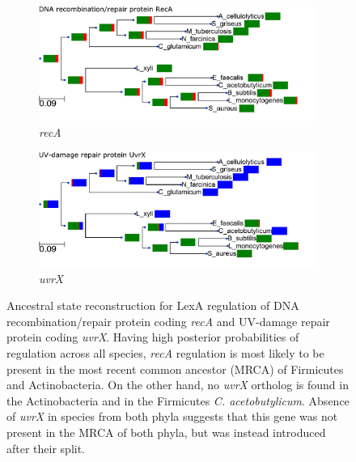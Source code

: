 \begin{figure}
  \centering
  \begin{subfigure}{0.49\textwidth}
    \includegraphics[width=\textwidth]{figures/chapter4/recA_ASR}
    \caption{\textit{recA}}
    \label{fig:ASR-a}
  \end{subfigure}
  \begin{subfigure}{0.49\textwidth}
    \includegraphics[width=\textwidth]{figures/chapter4/uvrX_ASR}
    \caption{\textit{uvrX}}
    \label{fig:ASR-b}
  \end{subfigure}
  \caption{Ancestral state reconstruction for LexA regulation of DNA
    recombination/repair protein coding \textit{recA} and UV-damage repair
    protein coding \textit{uvrX}. Having high posterior probabilities of
    regulation across all species, \textit{recA} regulation is most likely to
    be present in the most recent common ancestor (MRCA) of Firmicutes and
    Actinobacteria. On the other hand, no \textit{uvrX} ortholog is found in
    the Actinobacteria and in the Firmicutes \textit{C. acetobutylicum}. Absence of
    \textit{uvrX} in species from both phyla suggests that this gene was not present in
    the MRCA of both phyla, but was instead introduced after their split.}
  \label{fig:ASR}
 \end{figure}


